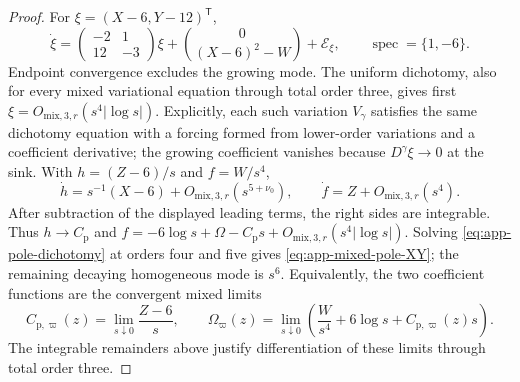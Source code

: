 \documentclass[11pt]{amsart}
\numberwithin{equation}{section}
\theoremstyle{definition}
\theoremstyle{remark}
\newcommand{\spec}{\operatorname {spec}}
\begin{document}
\begin{proof}
For $\xi=(X-6,Y-12)^{\mathsf T}$,
\begin{equation}\label{eq:app-pole-dichotomy}
 \dot\xi=
 \begin{pmatrix}-2&1\\12&-3\end{pmatrix}\xi
 +\binom0{(X-6)^2-W}+\mathcal E_\xi,
 \qquad\spec=\{1,-6\}.
\end{equation}
Endpoint convergence excludes the growing mode.  The uniform dichotomy,
also for every mixed variational equation through total order three, gives
first $\xi=O_{\mathrm{mix},3,r}(s^4|\log s|)$.  Explicitly, each such
variation $V_\gamma$ satisfies the same dichotomy equation with a forcing
formed from lower-order variations and a coefficient derivative; the
growing coefficient vanishes because $D^\gamma\xi\to0$ at the sink.
With
$h=(Z-6)/s$ and $f=W/s^4$,
\begin{equation}\label{eq:app-pole-hf}
 \dot h=s^{-1}(X-6)+O_{\mathrm{mix},3,r}(s^{5+\nu_0}),
 \qquad
 \dot f=Z+O_{\mathrm{mix},3,r}(s^4).
\end{equation}
After subtraction of the displayed leading terms, the right sides are
integrable.  Thus $h\to C_{\mathrm p}$ and
$f=-6\log s+\Omega-C_{\mathrm p}s
+O_{\mathrm{mix},3,r}(s^4|\log s|)$.
Solving \eqref{eq:app-pole-dichotomy} at orders four and five gives
\eqref{eq:app-mixed-pole-XY}; the remaining decaying homogeneous mode is
$s^6$.  Equivalently, the two coefficient functions are the convergent
mixed limits
\begin{equation}\label{eq:app-pole-coefficient-limits}
 C_{\mathrm p,\varpi}(z)=\lim_{s\downarrow0}\frac{Z-6}{s},
 \qquad
 \Omega_\varpi(z)=\lim_{s\downarrow0}
 \left(\frac W{s^4}+6\log s+C_{\mathrm p,\varpi}(z)s\right).
\end{equation}
The integrable remainders above justify differentiation of these limits
through total order three.


\end{proof}
\end{document}
